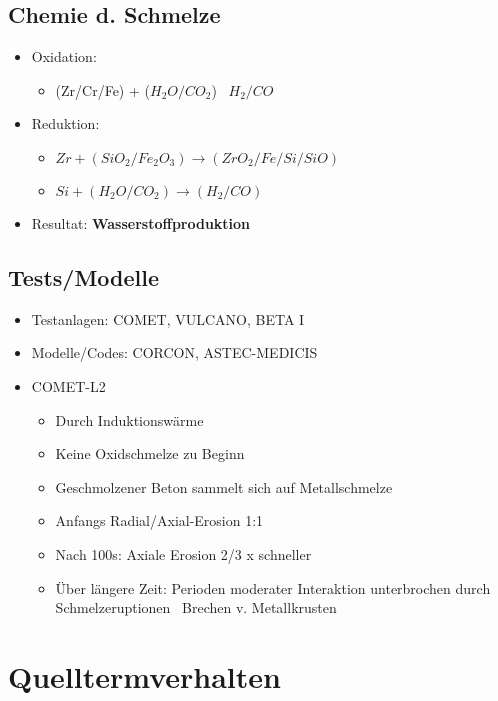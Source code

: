 \documentclass[12pt]{article}
\begin{document}
\subsection{Chemie d. Schmelze}
\begin{itemize}[noitemsep]
	\item Oxidation:
		\begin{itemize}[noitemsep]
			\item (Zr/Cr/Fe) + (\(H_2O/CO_2\)) \textrightarrow\ \(H_2/CO\)
		\end{itemize}
	\item Reduktion:
		\begin{itemize}[noitemsep]
			\item \(Zr + (SiO_2/Fe_2O_3) \rightarrow (ZrO_2/Fe/Si/SiO)\)
			\item \(Si + (H_2O/CO_2) \rightarrow (H_2/CO)\)
		\end{itemize}
	\item Resultat: \textbf{Wasserstoffproduktion}
\end{itemize}

\subsection{Tests/Modelle}
\begin{itemize}[noitemsep]
	\item Testanlagen: COMET, VULCANO, BETA I
	\item Modelle/Codes: CORCON, ASTEC-MEDICIS
	\item COMET-L2
		\begin{itemize}[noitemsep]
			\item Durch Induktionswärme
			\item Keine Oxidschmelze zu Beginn
			\item Geschmolzener Beton sammelt sich auf Metallschmelze
			\item Anfangs Radial/Axial-Erosion 1:1
			\item Nach 100s: Axiale Erosion 2/3 x schneller
			\item Über längere Zeit: Perioden moderater Interaktion unterbrochen durch Schmelzeruptionen
				\textrightarrow\ Brechen v. Metallkrusten
		\end{itemize}
\end{itemize}

\section{Quelltermverhalten}
\end{document}

